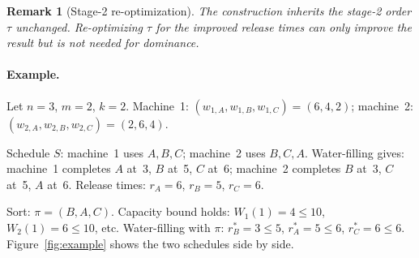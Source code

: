 \documentclass[11pt,titlepage]{article}
\newtheorem{remark}[theorem]{Remark}
\begin{document}
\begin{remark}[Stage-2 re-optimization]
The construction inherits the stage-2 order $\tau$ unchanged.
Re-optimizing $\tau$ for the improved release times can only
improve the result but is not needed for dominance.
\end{remark}

\paragraph{Example.}
Let $n = 3$, $m = 2$, $k = 2$. Machine~1: $(w_{1,A},
w_{1,B}, w_{1,C}) = (6, 4, 2)$; machine~2: $(w_{2,A},
w_{2,B}, w_{2,C}) = (2, 6, 4)$.

Schedule $S$: machine~1 uses $A, B, C$; machine~2 uses
$B, C, A$. Water-filling gives: machine~1 completes $A$ at~3,
$B$ at~5, $C$ at~6; machine~2 completes $B$ at~3, $C$ at~5,
$A$ at~6. Release times: $r_A = 6$, $r_B = 5$, $r_C = 6$.

Sort: $\pi = (B, A, C)$. Capacity bound holds:
$W_1(1) = 4 \leq 10$, $W_2(1) = 6 \leq 10$, etc.
Water-filling with $\pi$: $r^*_B = 3 \leq 5$,
$r^*_A = 5 \leq 6$, $r^*_C = 6 \leq 6$.
Figure~\ref{fig:example} shows the two schedules side by side.
\end{document}
